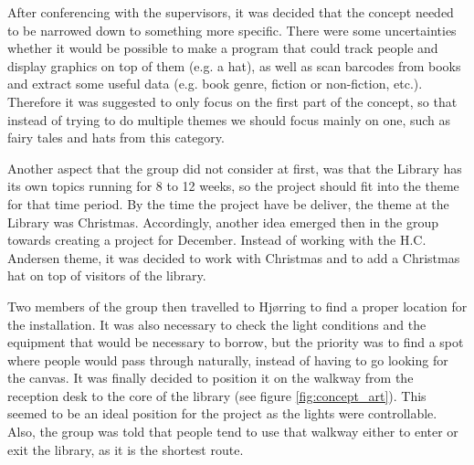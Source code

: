 After conferencing with the supervisors, it was decided that the concept needed to be narrowed down to something more specific. There were some uncertainties whether it would be possible to make a program that could track people and display graphics on top of them (e.g. a hat), as well as scan barcodes from books and extract some useful data (e.g. book genre, fiction or non-fiction, etc.). Therefore it was suggested to only focus on the first part of the concept, so that instead of trying to do multiple themes we should focus mainly on one, such as fairy tales and hats from this category.

Another aspect that the group did not consider at first, was that the Library has its own topics running for 8 to 12 weeks, so the project should fit into the theme for that time period. By the time the project have be deliver, the theme at the Library was Christmas. Accordingly, another idea emerged then in the group towards creating a project for December. Instead of working with the H.C. Andersen theme, it was decided to work with Christmas and to add a Christmas hat on top of visitors of the library.

Two members of the group then travelled to Hj{\o}rring to find a proper location for the installation. It was also necessary to check the light conditions and the equipment that would be necessary to borrow, but the priority was to find a spot where people would pass through naturally, instead of having to go looking for the canvas. It was finally decided to position it on the walkway from the reception desk to the core of the library (see figure \ref{fig:concept_art}). This seemed to be an ideal position for the project as the lights were controllable. Also, the group was told that people tend to use that walkway either to enter or exit the library, as it is the shortest route. 


